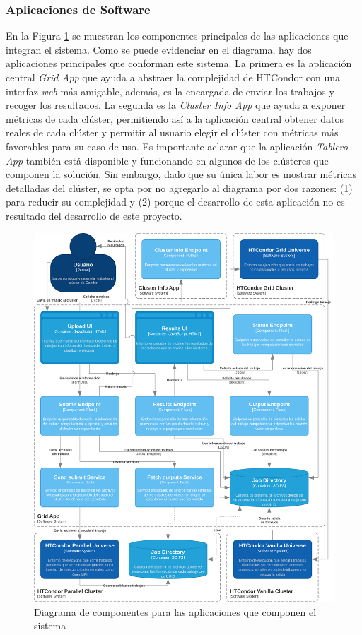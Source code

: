 \subsubsection{Aplicaciones de Software}
\noindent
En la Figura \ref{fig:C4Nivel3Apps} se muestran los componentes principales de las aplicaciones que integran el sistema. Como se puede evidenciar en el diagrama, hay dos aplicaciones principales que conforman este sistema. La primera es la aplicación central \textit{Grid App} que ayuda a abstraer la complejidad de HTCondor con una interfaz \textit{web} más amigable, además, es la encargada de enviar los trabajos y recoger los resultados. La segunda es la \textit{Cluster Info App} que ayuda a exponer métricas de cada clúster, permitiendo así a la aplicación central obtener datos reales de cada clúster y permitir al usuario elegir el clúster con métricas más favorables para su caso de uso. Es importante aclarar que la aplicación \textit{Tablero App} también está disponible y funcionando en algunos de los clústeres que componen la solución. Sin embargo, dado que su única labor es mostrar métricas detalladas del clúster, se opta por no agregarlo al diagrama por dos razones: (1) para reducir su complejidad y (2) porque el desarrollo de esta aplicación no es resultado del desarrollo de este proyecto.

\begin{figure}[H]
	\centering
	\includegraphics[scale=0.09]{tablas-images/C4/Diagramas HTCondor-Nivel 3 - Apps.drawio.png}
	\caption{Diagrama de componentes para las aplicaciones que componen el sistema}
    \label{fig:C4Nivel3Apps}
\end{figure}

